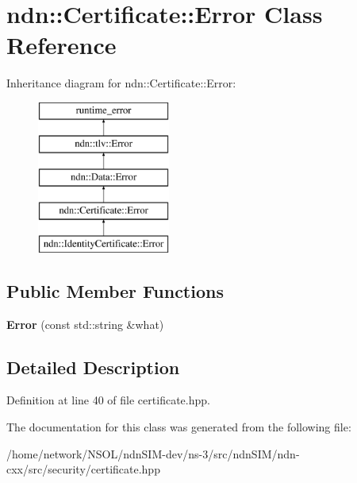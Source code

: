 \hypertarget{classndn_1_1Certificate_1_1Error}{}\section{ndn\+:\+:Certificate\+:\+:Error Class Reference}
\label{classndn_1_1Certificate_1_1Error}
Inheritance diagram for ndn\+:\+:Certificate\+:\+:Error\+:\begin{figure}[H]
\begin{center}
\leavevmode
\includegraphics[height=5.000000cm]{classndn_1_1Certificate_1_1Error}
\end{center}
\end{figure}
\subsection*{Public Member Functions}
\begin{DoxyCompactItemize}
\item 
{\bfseries Error} (const std\+::string \&what)\hypertarget{classndn_1_1Certificate_1_1Error_a6c8ab0d1f9457c633d36be7be4555351}{}\label{classndn_1_1Certificate_1_1Error_a6c8ab0d1f9457c633d36be7be4555351}

\end{DoxyCompactItemize}


\subsection{Detailed Description}


Definition at line 40 of file certificate.\+hpp.



The documentation for this class was generated from the following file\+:\begin{DoxyCompactItemize}
\item 
/home/network/\+N\+S\+O\+L/ndn\+S\+I\+M-\/dev/ns-\/3/src/ndn\+S\+I\+M/ndn-\/cxx/src/security/certificate.\+hpp\end{DoxyCompactItemize}
